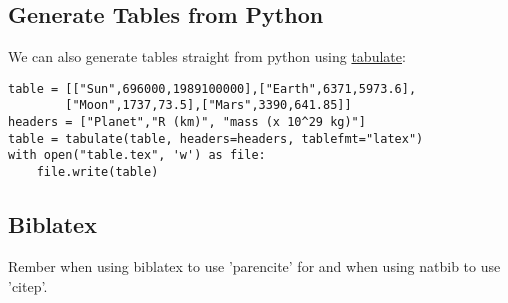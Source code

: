 \documentclass{article}
\begin{document}
\subsection{Generate Tables from Python}
We can also generate tables straight from python using \href{https://github.com/astanin/python-tabulate}{tabulate}:
\begin{verbatim}
table = [["Sun",696000,1989100000],["Earth",6371,5973.6],
        ["Moon",1737,73.5],["Mars",3390,641.85]]
headers = ["Planet","R (km)", "mass (x 10^29 kg)"]
table = tabulate(table, headers=headers, tablefmt="latex")
with open("table.tex", 'w') as file:
    file.write(table)
\end{verbatim}

\begin{table}[h]
    \centering
    
\end{table}

\subsection{Biblatex}
Rember when using biblatex to use 'parencite' for \citep{kamtheDataEfficient2018} and when using natbib to use 'citep'.

%
\end{document}
